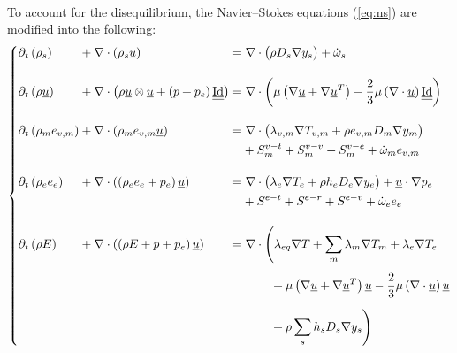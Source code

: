       \paragraph{}
      To account for the disequilibrium, the Navier--Stokes equations (\ref{eq:ns}) are modified into the following:
      \begin{equation}\label{eq:mte}
        \left\{\begin{alignedat}{5}
          &\partial_t\left(  \rho_s  \right) &&+ \nabla\cdot\left(  \rho_s \vec{u}  \right) &&=
            \nabla\cdot\bigl( \rho D_s \nabla y_s\bigr) + \dot \omega_s \\[10pt]
          &\partial_t\left(  \rho \vec{u}  \right) &&+ \nabla\cdot\left(  \rho \vec{u} \otimes \vec{u}  +  \left(p + p_e\right) \mat{\operatorname{Id}}  \right) &&=
            \nabla\cdot\biggl(
              \mu \left(\nabla \vec{u} + \nabla \vec{u}^T\right)
              - \frac{2}{3} \mu \left(\nabla \cdot \vec{u} \right) \mat{\operatorname{Id}}
            \biggr) \\[10pt]
          &\partial_t\left(  \rho_m e_{v,m}  \right) &&+ \nabla\cdot\left(  \rho_m e_{v,m} \vec{u}  \right) &&=
            \nabla\cdot\bigl(
              \lambda_{v,m} \nabla T_{v,m}
              + \rho e_{v,m} D_m \nabla y_m
            \bigr) \\
            &&&&& \phantom{= {}} + S^{v-t}_m + S^{v-v}_m + S^{v-e}_m + \dot \omega_m e_{v,m} \\[10pt]
          &\partial_t\left(  \rho_e e_e  \right) &&+ \nabla\cdot\left(  \left(\rho_e e_e + p_e\right) \vec{u}  \right) &&=
            \nabla\cdot\bigl(
              \lambda_e \nabla T_e
              + \rho h_e D_e \nabla y_e
            \bigr)
            + \vec{u} \cdot \nabla p_e \\
            &&&&& \phantom{= {}} + S^{e-t} + S^{e-r} + S^{e-v} + \dot \omega_e e_e \\[10pt]
          &\partial_t\left(  \rho E  \right) &&+ \nabla\cdot\left(  \left(\rho E + p + p_e\right) \vec{u}  \right) &&=
            \nabla\cdot\Biggl(
              \lambda_{eq} \nabla T
              + \sum_m \lambda_m \nabla T_m
              + \lambda_e \nabla T_e \\
              &&&&& \phantom{=\nabla\cdot\Biggl(} + \mu \left(\nabla \vec{u} + \nabla \vec{u}^T\right) \vec{u} - \frac{2}{3} \mu \left(\nabla \cdot \vec{u}\right) \vec{u} \\
              &&&&& \phantom{=\nabla\cdot\Biggl(} + \rho \sum_s h_s D_s \nabla y_s
            \Biggr)
        \end{alignedat}\right.
      \end{equation}
